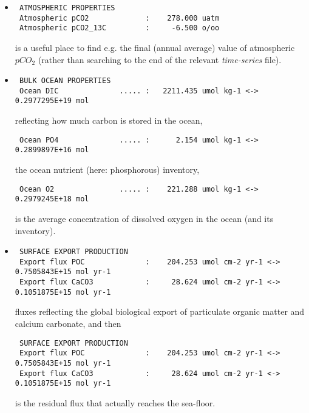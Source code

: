 \begin{itemize}[noitemsep]
\vspace{1mm}
\begin{itemize}[noitemsep]
\item
\vspace{1mm}
\vspace{-0mm}\footnotesize\begin{verbatim}
 ATMOSPHERIC PROPERTIES
 Atmospheric pCO2             :    278.000 uatm
 Atmospheric pCO2_13C         :     -6.500 o/oo
\end{verbatim}\normalsize\vspace{1mm}
is a useful place to find e.g. the final (annual average) value of atmospheric \(pCO_{2}\) (rather than searching to the end of the relevant \textit{time-series} file).
\item
\vspace{1mm}
\vspace{-0mm}\footnotesize\begin{verbatim}
 BULK OCEAN PROPERTIES
 Ocean DIC              ..... :   2211.435 umol kg-1 <->   0.2977295E+19 mol
\end{verbatim}\normalsize\vspace{1mm}
reflecting how much carbon is stored in the ocean, 
\vspace{0mm}\footnotesize\begin{verbatim}
 Ocean PO4              ..... :      2.154 umol kg-1 <->   0.2899897E+16 mol
\end{verbatim}\normalsize\vspace{0mm}
the ocean nutrient (here: phosphorous) inventory,
\vspace{-0mm}\footnotesize\begin{verbatim}
 Ocean O2               ..... :    221.288 umol kg-1 <->   0.2979245E+18 mol
\end{verbatim}\normalsize\vspace{0mm}
is the average concentration of dissolved oxygen in the ocean (and its inventory).
\item
\vspace{1mm}
\vspace{-0mm}\footnotesize\begin{verbatim}
 SURFACE EXPORT PRODUCTION
 Export flux POC              :    204.253 umol cm-2 yr-1 <->   0.7505843E+15 mol yr-1
 Export flux CaCO3            :     28.624 umol cm-2 yr-1 <->   0.1051875E+15 mol yr-1
\end{verbatim}\normalsize\vspace{1mm}
fluxes reflecting the global biological export of particulate organic matter and calcium carbonate, and then
\vspace{-0mm}\footnotesize\begin{verbatim}
 SURFACE EXPORT PRODUCTION
 Export flux POC              :    204.253 umol cm-2 yr-1 <->   0.7505843E+15 mol yr-1
 Export flux CaCO3            :     28.624 umol cm-2 yr-1 <->   0.1051875E+15 mol yr-1
\end{verbatim}\normalsize\vspace{0mm}
is the residual flux that actually reaches the sea-floor.
\end{itemize}


\end{itemize}
